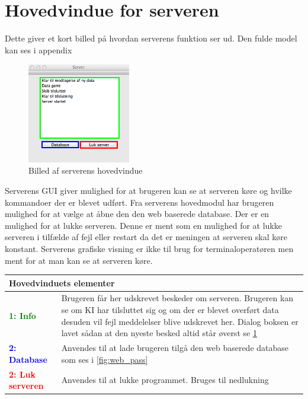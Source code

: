 \section*{Hovedvindue for serveren}
Dette giver et kort billed på hvordan serverens funktion ser ud. Den fulde model kan ses i appendix
\begin{figure}[htbp]
	\centering
	\includegraphics[width=0.4\textwidth]{billeder/server}
	\caption{Billed af serverens hovedvindue}
	\label{fig:server}
\end{figure}
Serverens GUI giver mulighed for at brugeren kan se at serveren køre og hvilke kommandoer der er blevet udført. Fra serverens hovedmodul har brugeren mulighed for at vælge at åbne den den web baserede database. Der er en mulighed for at lukke serveren. Denne er ment som en mulighed for at lukke serveren i tilfælde af fejl eller restart da det er meningen at serveren skal køre konstant. Serverens grafiske visning er ikke til brug for terminaloperatøren men ment for at man kan se at serveren køre.
\begin{table}[H]
\begin{tabular}{l p{12.5cm}}
\multicolumn{2}{l}{Hovedvinduets elementer} \\
\hline
\textcolor{green}{\textbf{1: Info}}
&Brugeren får her udskrevet beskeder om serveren. Brugeren kan se om KI har tilsluttet sig og om der er blevet overført data desuden vil fejl meddelelser blive udskrevet her. Dialog boksen er lavet sådan at den nyeste besked altid står øverst se \ref{fig:server}\\

\textcolor{blue}{\textbf{2: Database}}
&Anvendes til at lade brugeren tilgå den web baserede database som ses i \ref{fig:web_pass}\\

\textcolor{red}{\textbf{2: Luk serveren}}
&Anvendes til at lukke programmet. Bruges til nedlukning\\

\end{tabular}
\end{table}


